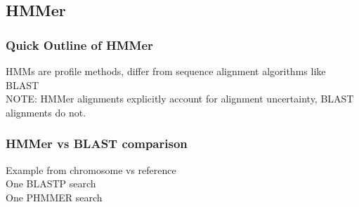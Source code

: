 %

\subsection{HMMer}
    \begin{frame}
      \frametitle{Quick Outline of HMMer}   
      HMMs are profile methods, differ from sequence alignment algorithms like BLAST \\
      NOTE: HMMer alignments explicitly account for alignment uncertainty, BLAST alignments do not.
    \end{frame}

    \begin{frame}
      \frametitle{HMMer vs BLAST comparison}   
      Example from chromosome vs reference \\
      One BLASTP search \\
      One PHMMER search
    \end{frame}
